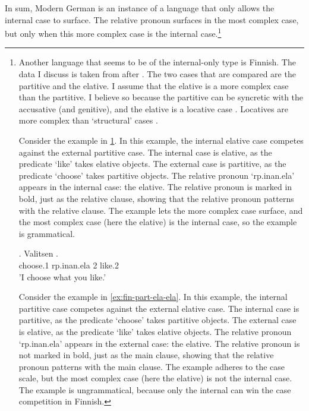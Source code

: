 In sum, Modern German is an instance of a language that only allows the internal case to surface. The relative pronoun surfaces in the most complex case, but only when this more complex case is the internal case.\footnote{
Another language that seems to be of the internal-only type is Finnish. The data I discuss is taken from \citet{bresnan1978} after \citet{carlson1977}.
The two cases that are compared are the partitive and the elative. I assume that the elative is a more complex case than the partitive. I believe so because the partitive can be syncretic with the accusative (and genitive), and the elative is a locative case \citep{karlsson2013}. Locatives are more complex than `structural' cases \citep[cf.][]{caha2009}.

Consider the example in \ref{ex:fin-ela-part}. In this example, the internal elative case competes against the external partitive case.
The internal case is elative, as the predicate  `like' takes elative objects.
The external case is partitive, as the predicate  `choose' takes partitive objects.
The relative pronoun  `\ac{rp}.\ac{inan}.\ac{ela}' appears in the internal case: the elative. The relative pronoun is marked in bold, just as the relative clause, showing that the relative pronoun patterns with the relative clause.
The example lets the more complex case surface, and the most complex case (here the elative) is the internal case, so the example is grammatical.

\exg. Valitsen   .\\
choose.1\scsub{[part]} \ac{rp}.\ac{inan}.\ac{ela} 2 like.2\scsub{[ela]}\\
'I choose what you like.' \label{ex:fin-ela-part}

Consider the example in \ref{ex:fin-part-ela-ela}. In this example, the internal partitive case competes against the external elative case.
The internal case is partitive, as the predicate  `choose' takes partitive objects.
The external case is elative, as the predicate  `like' takes elative objects.
The relative pronoun  `\ac{rp}.\ac{inan}.\ac{ela}' appears in the external case: the elative. The relative pronoun is not marked in bold, just as the main clause, showing that the relative pronoun patterns with the main clause.
The example adheres to the case scale, but the most complex case (here the elative) is not the internal case. The example is ungrammatical, because only the internal can win the case competition in Finnish.

}
